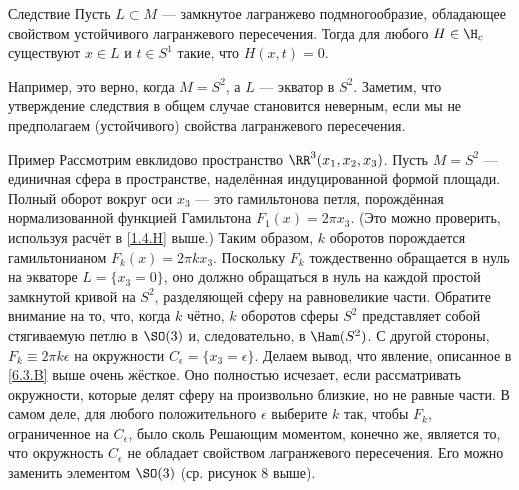 \begin{thm}{Следствие}\label{6.3.B}
Пусть $L \subset M$ --- замкнутое лагранжево подмногообразие, обладающее свойством устойчивого лагранжевого пересечения.
Тогда для любого $H \in \H_c$ существуют $x \in L$ и $t \in S^1$ такие, что $H (x, t) = 0$.
\end{thm}


Например, это верно, когда $M = S^2$, а $L$ --- экватор в $S^2$.
Заметим, что утверждение следствия в общем случае становится неверным, если мы не предполагаем (устойчивого) свойства лагранжевого пересечения.

\begin{thm}{Пример}\label{6.3.C}
Рассмотрим евклидово пространство $\RR^3 (x_1, x_2, x_3)$.
Пусть $M = S^2$ --- единичная сфера в пространстве, наделённая индуцированной формой площади.
Полный оборот вокруг оси $x_3$ --- это гамильтонова петля, порождённая нормализованной функцией Гамильтона $F_1 (x) = 2\pi x_3$.
(Это можно проверить, используя расчёт в \ref{1.4.H} выше.)
Таким образом, $k$ оборотов порождается гамильтонианом $F_k (x) = 2\pi k x_3$.
Поскольку $F_k$ тождественно обращается в нуль на экваторе $L = \{x_3 = 0\}$, оно должно обращаться в нуль на каждой простой замкнутой кривой на $S^2$, разделяющей сферу на равновеликие части.
Обратите внимание на то, что, когда $k$ чётно, $k$ оборотов сферы $S^2$ представляет собой стягиваемую петлю в $\SO (3)$ и, следовательно, в $\Ham (S^2)$.
С другой стороны, $F_k \equiv 2\pi k\epsilon$ на окружности $C_\epsilon = \{x_3 = \epsilon\}$.
Делаем вывод, что явление, описанное в \ref{6.3.B} выше очень жёсткое.
Оно полностью исчезает, если рассматривать окружности, которые делят сферу на произвольно близкие, но не равные части.
В самом деле, для любого положительного $\epsilon$ выберите $k$ так, чтобы $F_k$, ограниченное на $C_\epsilon$, было сколь 
Решающим моментом, конечно же, является то, что окружность $C_\epsilon$ не обладает свойством лагранжевого пересечения.
Его можно заменить элементом $\SO (3)$ (ср.
рисунок 8 выше). 
\end{thm}

